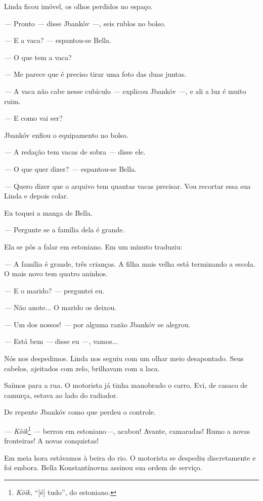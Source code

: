 Linda ficou imóvel, os olhos perdidos no espaço.

\emph{---} Pronto \emph{---} disse Jbankóv \emph{---,} seis rublos no
bolso.

\emph{---} E a vaca? \emph{---} espantou-se Bella.

\emph{---} O que tem a vaca?

\emph{---} Me parece que é preciso tirar uma foto das duas juntas.

\emph{---} A vaca não cabe nesse cubículo \emph{---} explicou Jbankóv
\emph{---}, e ali a luz é muito ruim.

\emph{---} E como vai ser?

Jbankóv enfiou o equipamento no bolso.

\emph{---} A redação tem vacas de sobra \emph{---} disse ele.

\emph{---} O que quer dizer? \emph{---} espantou-se Bella.

\emph{---} Quero dizer que o arquivo tem quantas vacas precisar. Vou
recortar essa sua Linda e depois colar.

Eu toquei a manga de Bella.

\emph{---} Pergunte se a família dela é grande.

Ela se pôs a falar em estoniano. Em um minuto traduziu:

\emph{---} A família é grande, três crianças. A filha mais velha está
terminando a escola. O mais novo tem quatro aninhos.

\emph{---} E o marido? \emph{---} perguntei eu.

\emph{---} Não anote... O marido os deixou.

\emph{---} Um dos nossos! \emph{---} por alguma razão Jbankóv se
alegrou.

\emph{---} Está bem \emph{---} disse eu \emph{---}, vamos...

Nós nos despedimos. Linda nos seguiu com um olhar meio desapontado. Seus
cabelos, ajeitados com zelo, brilhavam com a laca.

Saímos para a rua. O motorista já tinha manobrado o carro. Evi, de
casaco de camurça, estava ao lado do radiador.

De repente Jbankóv como que perdeu o controle.

\emph{--- Kõik}\footnote{\emph{Kõik,} ``{[}é{]} tudo'', do estoniano.}
\emph{---} berrou em estoniano\emph{---}, acabou! Avante, camaradas!
Rumo a novas fronteiras! A novas conquistas!

Em meia hora estávamos à beira do rio. O motorista se despediu
discretamente e foi embora. Bella Konstantínovna assinou sua ordem de
serviço.

